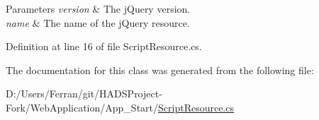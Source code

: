 \begin{DoxyParams}{Parameters}
{\em version} & The {\ttfamily j\+Query} version.\\
\hline
{\em name} & The name of the {\ttfamily j\+Query} resource.\\
\hline
\end{DoxyParams}


Definition at line 16 of file Script\+Resource.\+cs.



The documentation for this class was generated from the following file\+:\begin{DoxyCompactItemize}
\item 
D\+:/\+Users/\+Ferran/git/\+H\+A\+D\+S\+Project-\/\+Fork/\+Web\+Application/\+App\+\_\+\+Start/\mbox{\hyperlink{ScriptResource_8cs}{Script\+Resource.\+cs}}\end{DoxyCompactItemize}
